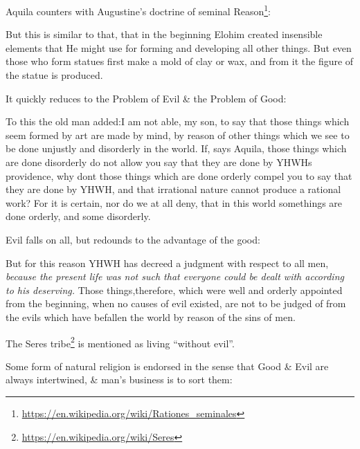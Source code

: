 Aquila counters with Augustine's doctrine of seminal Reason\footnote{\url{https://en.wikipedia.org/wiki/Rationes\_seminales}}:

\begin{quotex}
But this is similar to that, that in the beginning Elohim created insensible elements that He might use for forming and developing all other things. But even those who form statues first make a mold of clay or wax, and from it the figure of the statue is produced.
\end{quotex}


It quickly reduces to the Problem of Evil \& the Problem of Good:

\begin{quotex}
To this the old man added:I am not able, my son, to say that those things which seem formed by art are made by mind, by reason of other things which we see to be done unjustly and disorderly in the world. If, says Aquila, those things which are done disorderly do not allow you say that they are done by YHWHs providence, why dont those things which are done orderly compel you to say that they are done by YHWH, and that irrational nature cannot produce a rational work? For it is certain, nor do we at all deny, that in this world somethings are done orderly, and some disorderly.
\end{quotex}


Evil falls on all, but redounds to the advantage of the good:

\begin{quotex}
But for this reason YHWH has decreed a judgment with respect to all men, \emph{because the present life was not such that everyone could be dealt with according to his deserving.} Those things,therefore, which were well and orderly appointed from the beginning, when no causes of evil existed, are not to be judged of from the evils which have befallen the world by reason of the sins of men.
\end{quotex}


The Seres tribe\footnote{\url{https://en.wikipedia.org/wiki/Seres}} is mentioned as living ``without evil''.

Some form of natural religion is endorsed in the sense that Good \& Evil are always intertwined, \& man's business is to sort them:

